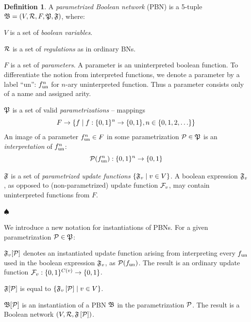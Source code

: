 \documentclass[
	digital, oneside, nosansbold, nocolorbold, nolot, nolof
]{fithesis4}
\theoremstyle{definition}
\newtheorem{definition}{Definition}
\theoremstyle{definition}
\newenvironment{ldefinition}
    {\begin{definition}}
	{\par\hspace{\stretch{1}}$\spadesuit$\hspace{\stretch{1}}
     \par\end{definition}}
\DeclarePairedDelimiter{\set}{\{}{\}}
\begin{document}
\begin{ldefinition}
A \emph{parametrized Boolean network} (PBN) is a 5-tuple
$\mathfrak{B} = (V, \mathcal{R}, F, \mathfrak{P}, \mathfrak{F})$, where:
\begin{description}
    \item $V$ is a set of \emph{boolean variables}.
    \item $\mathcal{R}$ is a set of \emph{regulations} as in ordinary BNs.
    \item $F$ is a set of \emph{parameters}. A parameter is an uninterpreted
        boolean function. To differentiate the notion from interpreted
        functions, we denote a parameter by a label \enquote{un}: $f_{\textrm{un}}^{n}$
        for $n$-ary uninterpreted function. Thus a parameter consists only
        of a name and assigned arity.
    \item $\mathfrak{P}$ is a set of valid \emph{parametrizations} -- mappings
        \[
            F \to \set*{ f \mid f : \set{0,1}^n \to \set{0,1},
                n \in \set{0, 1, 2, \ldots} }
        \]
        An image of a parameter $f_{\textrm{un}}^{n} \in F$ in some parametrization
        $\mathcal{P} \in \mathfrak{P}$ is an \emph{interpretation} of
        $f_{\textrm{un}}^{n}$:
        \[
            \paron{P}(\unf{f}^{n}): \set{0, 1}^n \to \set{0, 1}
        \]
    \item $\mathfrak{F}$ is a set of \emph{parametrized update functions} $\set*{
        \PBNUFs{F}_v \mid v \in V }$. A boolean expression $\mathfrak{F}_v$, as
        opposed to (non-parametrized) update function $\mathcal{F}_v$, may
        contain uninterpreted functions from $F$.
\end{description}
\end{ldefinition}

We introduce a new notation for instantiations of PBNs. For a given
parametrization $\mathcal{P} \in \mathfrak{P}$:
\begin{description}
    \item $\mathfrak{F}_v[\mathcal{P}]$ denotes an instantiated
        update function arising from interpreting every $f_{\textrm{un}}$ used in the
        boolean expression $\mathfrak{F}_v$, as $\mathcal{P}(f_{\textrm{un}})$.
        The result is an ordinary update function $\BNUFs{F}_v : \set{0,
        1}^{C(v)} \to \set{0, 1}$.
    \item $\mathfrak{F}[\mathcal{P}]$ is equal to $\set{
        \PBNUFs{F}_v\left[\paron{P}\right] \mid v \in V }$.
    \item $\mathfrak{B}[\mathcal{P}]$ is an instantiation of a PBN
        $\mathfrak{B}$ in the parametrization $\mathcal{P}$. The result is a Boolean
        network $\left(V, \mathcal{R}, \mathfrak{F}\left[\mathcal{P}\right]\right)$.
\end{description}
\end{document}
